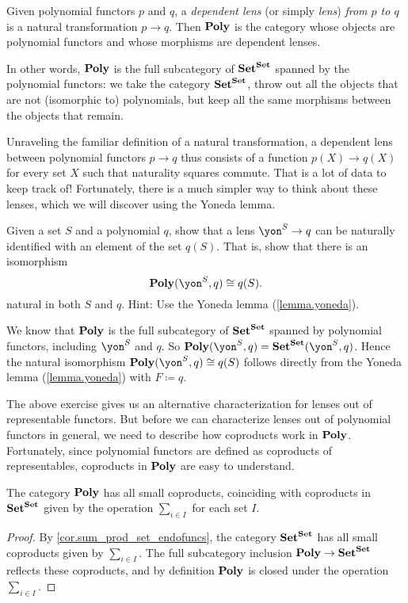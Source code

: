 \documentclass[Book-Poly]{subfiles}
\begin{document}
\begin{definition} \label{def.poly_cat}
Given polynomial functors $p$ and $q$, a \emph{dependent lens} (or simply \emph{lens}) \emph{from $p$ to $q$} is a natural transformation $p\to q$.
Then $\mathbf{Poly}$ is the category whose objects are polynomial functors and whose morphisms are dependent lenses.
\end{definition}

In other words, $\mathbf{Poly}$ is the full subcategory of $\mathbf{Set}^{\mathbf{Set}}$ spanned by the polynomial functors: we take the category $\mathbf{Set}^{\mathbf{Set}}$, throw out all the objects that are not (isomorphic to) polynomials, but keep all the same morphisms between the objects that remain.

Unraveling the familiar definition of a natural transformation, a dependent lens between polynomial functors $p \to q$ thus consists of a function $p(X) \to q(X)$ for every set $X$ such that naturality squares commute.
That is a lot of data to keep track of!
Fortunately, there is a much simpler way to think about these lenses, which we will discover using the Yoneda lemma.

\begin{exercise} \label{exc.poly_morph_yoneda}
Given a set $S$ and a polynomial $q$, show that a lens $\yon^S \to q$ can be naturally identified with an element of the set $q(S)$.
That is, show that there is an isomorphism
\[
    \poly(\yon^S, q) \iso q(S).
\]
natural in both $S$ and $q$.
Hint: Use the Yoneda lemma (\cref{lemma.yoneda}).
\begin{solution}
We know that $\mathbf{Poly}$ is the full subcategory of $\mathbf{Set}^{\mathbf{Set}}$ spanned by polynomial functors, including $\yon^S$ and $q$.
So $\poly(\yon^S, q)=\smset^\smset(\yon^S, q)$.
Hence the natural isomorphism $\poly(\yon^S, q)\iso q(S)$ follows directly from the Yoneda lemma (\cref{lemma.yoneda}) with $F\coloneqq q$.
\end{solution}
\end{exercise}

The above exercise gives us an alternative characterization for lenses out of representable functors.
But before we can characterize lenses out of polynomial functors in general, we need to describe how coproducts work in $\mathbf{Poly}$.
Fortunately, since polynomial functors are defined as coproducts of representables, coproducts in $\mathbf{Poly}$ are easy to understand.

\begin{proposition} \label{prop.poly_coprods}
  The category $\mathbf{Poly}$ has all small coproducts, coinciding with coproducts in $\mathbf{Set}^{\mathbf{Set}}$ given by the operation $\sum_{i \in I}$ for each set $I$.
\end{proposition}
\begin{proof}
  By \cref{cor.sum_prod_set_endofuncs}, the category $\mathbf{Set}^{\mathbf{Set}}$ has all small coproducts given by $\sum_{i\in I}$.
  The full subcategory inclusion $\mathbf{Poly}\to \mathbf{Set}^{\mathbf{Set}}$ reflects these coproducts, and by definition $\mathbf{Poly}$ is closed under the operation $\sum_{i \in I}$.
\end{proof}
\end{document}
